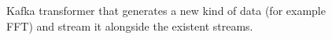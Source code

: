 \begin{figure}
\begin{centering}

\par\end{centering}
\caption[Kafka transformer]{Kafka transformer that generates a new kind of data (for example FFT) and stream it alongside the existent streams.}
\label{fig:transformer}
\end{figure}
